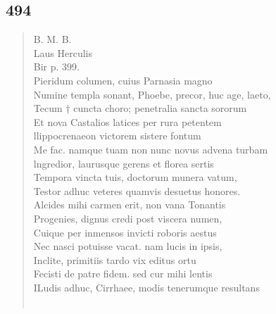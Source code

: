 \documentclass[11pt, a4paper]{report}
\begin{document}
            \subsection*{494}
      \begin{verse}
      B. M. B. \\ Laus Herculis \\ Bir p. 399. \\ Pieridum columen, cuius Parnasia magno \\ Numine templa sonant, Phoebe, precor, huc age, laeto, \\ Tecum † cuncta choro; penetralia sancta sororum \\ Et nova Castalios latices per rura petentem \\ llippocrenaeon victorem sistere fontum \\ Me fac. namque tuam non nunc novus advena turbam \\ lngredior, laurusque gerens et florea sertis \\ Tempora vincta tuis, doctorum munera vatum, \\ Testor adhuc veteres quamvis desuetus honores. \\ Alcides mihi carmen erit, non vana Tonantis \\ Progenies, dignus credi post viscera numen, \\ Cuique per inmensos invicti roboris aestus \\ Nec nasci potuisse vacat. nam lucis in ipsis, \\ Inclite, primitiis tardo vix editus ortu \\ Fecisti de patre fidem. sed cur mihi lentis \\ ILudis adhuc, Cirrhaee, modis tenerumque resultans \\ 
        ﻿\pagebreak 

\end{verse}
\end{document}
